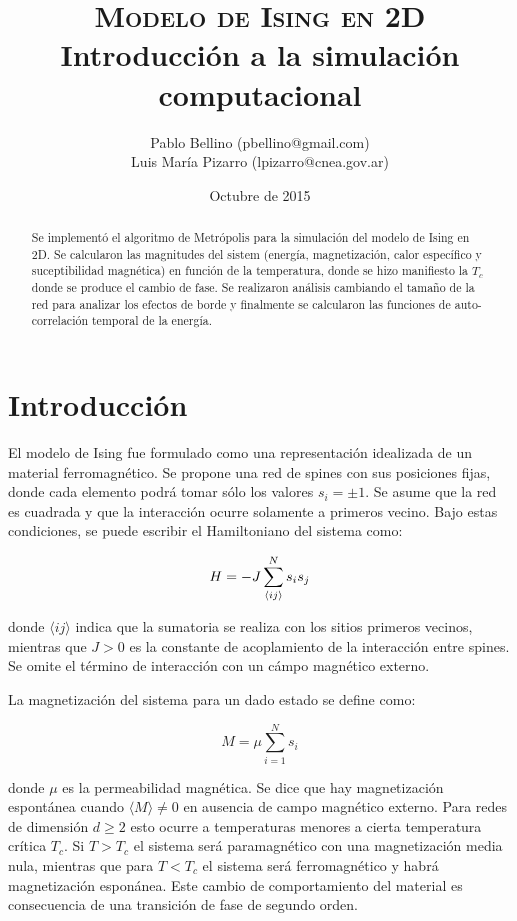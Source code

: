 \documentclass[a4paper,12pt]{article}
\title{\textsc{Modelo de Ising en 2D} \\ \vspace{2em} \Large{Introducción a la 
simulación computacional}}
\author{\small{ Pablo Bellino (pbellino@gmail.com)} \\
        \small{Luis María Pizarro (lpizarro@cnea.gov.ar)}}
\date{Octubre de 2015}
\begin{document}

\maketitle

\begin{abstract}
Se implementó el algoritmo de Metrópolis para la simulación del modelo de Ising 
en 2D. Se calcularon las magnitudes del sistem (energía, magnetización, calor 
específico y suceptibilidad magnética) en función de la temperatura, donde se 
hizo manifiesto la $T_c$ donde se produce el cambio de fase. Se realizaron 
análisis cambiando el tamaño de la red para analizar los efectos de borde y 
finalmente se calcularon las funciones de auto-correlación temporal de la 
energía.
\end{abstract}


\section{Introducción}

El modelo de Ising fue formulado como una representación idealizada de un 
material ferromagnético. Se propone una red de spines con sus posiciones fijas, 
donde cada elemento podrá tomar sólo los valores $s_i=\pm1$. Se asume que la 
red es cuadrada y que la interacción ocurre solamente a primeros vecino. Bajo 
estas condiciones, se puede escribir el Hamiltoniano del sistema como:  

\begin{equation}{\label{eq:hamiltoniano}}
H = - J \sum_{\langle ij \rangle}^N s_is_j
\end{equation}

\noindent donde $\langle ij \rangle$ indica que la sumatoria se realiza con los 
sitios primeros vecinos, mientras que $J>0$ es la constante de acoplamiento de 
la interacción entre spines. Se omite el término de interacción con un cámpo 
magnético externo.

La magnetización del sistema para un dado estado se define como:

\begin{equation}
M = \mu \sum_{i=1}^N s_i
\end{equation}

\noindent donde $\mu$ es la permeabilidad magnética. Se dice que hay 
magnetización espontánea cuando $\langle M \rangle \neq 0 $ en ausencia de 
campo magnético externo. Para redes de dimensión $d \geq 2$ esto ocurre a 
temperaturas menores a cierta temperatura crítica $T_c$. Si $T>T_c$ el sistema 
será paramagnético con una magnetización media nula, mientras que para $T<T_c$ 
el sistema será ferromagnético y habrá magnetización esponánea. Este cambio de 
comportamiento del material es consecuencia de una transición de fase de 
segundo orden.
\end{document}
